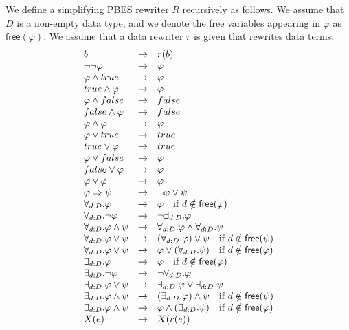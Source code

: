 \documentclass{article}
\begin{document}
We define a simplifying PBES rewriter $R$ recursively as follows. We assume
that $D$ is a non-empty data type, and we denote the free variables
appearing in $\varphi $ as $\mathsf{free}(\varphi )$. We assume that a data
rewriter $r$ is given that rewrites data terms.%
\begin{equation*}
\begin{array}{lcl}
b & \rightarrow & r(b) \\
\lnot \lnot \varphi & \rightarrow & \varphi \\
\varphi \wedge true & \rightarrow & \varphi \\
true\wedge \varphi & \rightarrow & \varphi \\
\varphi \wedge false & \rightarrow & false \\
false\wedge \varphi & \rightarrow & false \\
\varphi \wedge \varphi & \rightarrow & \varphi \\
\varphi \vee true & \rightarrow & true \\
true\vee \varphi & \rightarrow & true \\
\varphi \vee false & \rightarrow & \varphi \\
false\vee \varphi & \rightarrow & \varphi \\
\varphi \vee \varphi & \rightarrow & \varphi \\
\varphi \Rightarrow \psi & \rightarrow & \lnot \varphi \vee \psi \\
\forall _{d:D}.\varphi & \rightarrow & \varphi \text{ if }d\notin \mathsf{%
free}(\varphi ) \\
\forall _{d:D}.\lnot \varphi & \rightarrow & \lnot \exists _{d:D}.\varphi \\
\forall _{d:D}.\varphi \wedge \psi & \rightarrow & \forall _{d:D}.\varphi
\wedge \forall _{d:D}.\psi \\
\forall _{d:D}.\varphi \vee \psi & \rightarrow & (\forall _{d:D}.\varphi
)\vee \psi \text{ if }d\notin \mathsf{free}(\psi ) \\
\forall _{d:D}.\varphi \vee \psi & \rightarrow & \varphi \vee (\forall
_{d:D}.\psi )\text{ if }d\notin \mathsf{free}(\varphi ) \\
\exists _{d:D}.\varphi & \rightarrow & \varphi \text{ if }d\notin \mathsf{%
free}(\varphi ) \\
\exists _{d:D}.\lnot \varphi & \rightarrow & \lnot \forall _{d:D}.\varphi \\
\exists _{d:D}.\varphi \vee \psi & \rightarrow & \exists _{d:D}.\varphi \vee
\exists _{d:D}.\psi \\
\exists _{d:D}.\varphi \wedge \psi & \rightarrow & (\exists _{d:D}.\varphi
)\wedge \psi \text{ if }d\notin \mathsf{free}(\psi ) \\
\exists _{d:D}.\varphi \wedge \psi & \rightarrow & \varphi \wedge (\exists
_{d:D}.\psi )\text{ if }d\notin \mathsf{free}(\varphi ) \\
X(e) & \rightarrow & X(r(e))%
\end{array}%
\end{equation*}%
\end{document}
